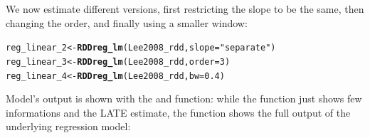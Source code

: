 \documentclass[english,nojss]{jss}\usepackage{graphicx, color}
\makeatletter
\newcommand{\hlfunctioncall}[1]{\textcolor[rgb]{0.501960784313725,0,0.329411764705882}{\textbf{#1}}}%
\newcommand{\hlstring}[1]{\textcolor[rgb]{0.6,0.6,1}{#1}}%
\newenvironment{kframe}{%
 \def\at@end@of@kframe{}%
 \ifinner\ifhmode%
  \def\at@end@of@kframe{\end{minipage}}%
  \begin{minipage}{\columnwidth}%
 \fi\fi%
 \def\FrameCommand##1{\hskip\@totalleftmargin \hskip-\fboxsep
 \colorbox{shadecolor}{##1}\hskip-\fboxsep
     \hskip-\linewidth \hskip-\@totalleftmargin \hskip\columnwidth}%
 \MakeFramed {\advance\hsize-\width
   \@totalleftmargin\z@ \linewidth\hsize
   \@setminipage}}%
 {\par\unskip\endMakeFramed%
 \at@end@of@kframe}
\newenvironment{knitrout}{}{} %
\makeatother
\begin{document}
We now estimate different versions, first restricting the slope to
be the same, then changing the order, and finally using a smaller
window:

\begin{knitrout}
\color{fgcolor}\begin{kframe}
\begin{alltt}
reg_linear_2 <- \hlfunctioncall{RDDreg_lm}(Lee2008_rdd, slope = \hlstring{"separate"})
reg_linear_3 <- \hlfunctioncall{RDDreg_lm}(Lee2008_rdd, order = 3)
reg_linear_4 <- \hlfunctioncall{RDDreg_lm}(Lee2008_rdd, bw = 0.4)
\end{alltt}
\end{kframe}
\end{knitrout}


Model's output is shown with the  and 
function: while the  function just shows few informations
and the LATE estimate, the  function shows the full
output of the underlying regression model:
\end{document}

